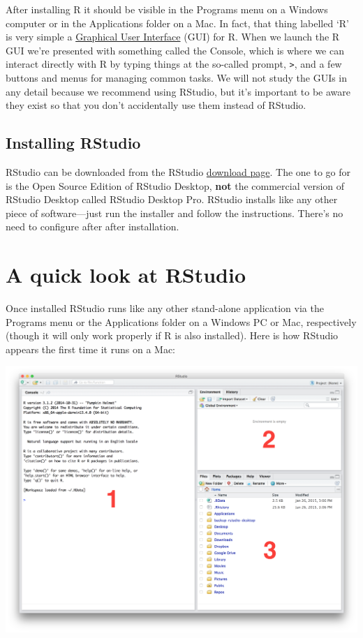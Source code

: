 \documentclass[
]{book}
\begin{document}
After installing R it should be visible in the Programs menu on a Windows computer or in the Applications folder on a Mac. In fact, that thing labelled `R' is very simple a \href{http://en.wikipedia.org/wiki/Graphical_user_interface}{Graphical User Interface} (GUI) for R. When we launch the R GUI we're presented with something called the Console, which is where we can interact directly with R by typing things at the so-called prompt, \texttt{\textgreater{}}, and a few buttons and menus for managing common tasks. We will not study the GUIs in any detail because we recommend using RStudio, but it's important to be aware they exist so that you don't accidentally use them instead of RStudio.

\hypertarget{installing-rstudio}{%
\subsection*{Installing RStudio}\label{installing-rstudio}}

RStudio can be downloaded from the RStudio \href{http://www.rstudio.com/products/RStudio/\#Desk}{download page}. The one to go for is the Open Source Edition of RStudio Desktop, \textbf{not} the commercial version of RStudio Desktop called RStudio Desktop Pro. RStudio installs like any other piece of software---just run the installer and follow the instructions. There's no need to configure after after installation.

\hypertarget{a-quick-look-at-rstudio}{%
\section*{A quick look at RStudio}\label{a-quick-look-at-rstudio}}

Once installed RStudio runs like any other stand-alone application via the Programs menu or the Applications folder on a Windows PC or Mac, respectively (though it will only work properly if R is also installed). Here is how RStudio appears the first time it runs on a Mac:

\begin{center}\includegraphics[width=40.44in]{images/RStudio-3-pane} \end{center}
\end{document}
